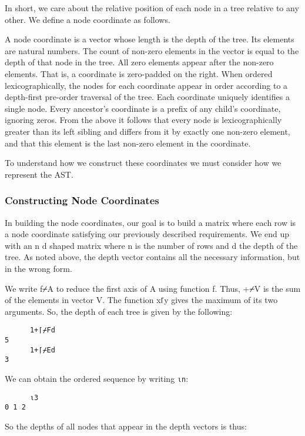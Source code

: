 \documentclass[pldi]{sigplanconf-pldi15}
\begin{document}
In short, we care about the relative position of each node in a tree relative to any other. We define a node 
coordinate as follows.

A node coordinate is a vector whose length is the depth of the tree. Its elements are natural numbers. 
The count of non-zero elements in the vector is equal to the depth of that node in the tree. All zero elements
appear after the non-zero elements. That is, a coordinate is zero-padded on the right. When ordered 
lexicographically, the nodes for each coordinate appear in order according to a depth-first pre-order 
traversal of the tree. Each coordinate uniquely identifies a single node. Every ancestor’s coordinate is a 
prefix of any child’s coordinate, ignoring zeros. From the above it follows that every node is lexicographically 
greater than its left sibling and differs from it by exactly one non-zero element, and that this element is the 
last non-zero element in the coordinate. 

To understand how we construct these coordinates we must consider how we represent the AST.
\subsubsection{Constructing Node Coordinates}

In building the node coordinates, our goal is to build a matrix where each row is a node 
coordinate satisfying our previously described requirements. We end up with an n d 
shaped matrix where n is the number of rows and d the depth of the tree. As noted above, 
the depth vector contains all the necessary information, but in the wrong form. 

We write f⌿A to reduce the first axis of A using function f. Thus, +⌿V is the sum of the 
elements in vector V. The function x⌈y gives the maximum of its two arguments. So, the 
depth of each tree is given by the following:

\begin{verbatim}
      1+⌈⌿Fd
5
      1+⌈⌿Ed
3
\end{verbatim}

We can obtain the ordered sequence  by writing \verb;⍳n;:

\begin{verbatim}
      ⍳3
0 1 2
\end{verbatim}

So the depths of all nodes that appear in the depth vectors is thus:
\end{document}
